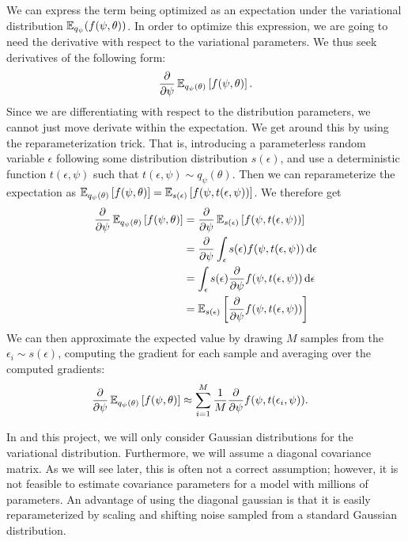 We can express the term being optimized as an expectation under the variational distribution $\operatorname{\mathbb{E}}_{q_{\psi}}(f(\psi, \theta))$.
In order to optimize this expression, we are going to need the derivative with respect to the variational parameters.
We thus seek derivatives of the following form:
\begin{align}
    \pdv{\psi} \operatorname{\mathbb{E}}_{q_\psi(\theta)}\left[ f(\psi, \theta) \right].
\end{align}
Since we are differentiating with respect to the distribution parameters, we cannot just move derivate within the expectation.
We get around this by using the reparameterization trick.
That is, introducing a parameterless random variable $\epsilon$ following some distribution distribution $s(\epsilon)$, and use a deterministic function $t(\epsilon, \psi)$ such that $t(\epsilon, \psi) \sim q_\psi(\theta)$.
Then we can reparameterize the expectation as
$ \operatorname{\mathbb{E}}_{q_\psi(\theta)}\left[ f(\psi, \theta) \right] = \operatorname{\mathbb{E}}_{s(\epsilon)}\left[ f(\psi, t(\epsilon, \psi)) \right]$.
We therefore get
\begin{equation}
    \begin{aligned}
        \pdv{\psi} \operatorname{\mathbb{E}}_{q_\psi(\theta)}\left[ f(\psi, \theta) \right] &= \pdv{\psi}\operatorname{\mathbb{E}}_{s(\epsilon)}\left[ f(\psi, t(\epsilon, \psi)) \right] \\
        &= \pdv{\psi} \int_\epsilon s(\epsilon) f(\psi, t(\epsilon, \psi))\dd{\epsilon}\\
        &= \int_\epsilon s(\epsilon) \pdv{\psi} f(\psi, t(\epsilon, \psi)) \dd{\epsilon}\\
        &= \operatorname{\mathbb{E}}_{s(\epsilon)} \left[ \pdv{\psi} f(\psi, t(\epsilon, \psi)) \right]
    \end{aligned}
\end{equation}
We can then approximate the expected value by drawing $M$ samples from the $\epsilon_i\sim s(\epsilon)$, computing the gradient for each sample and averaging over the computed gradients:
\begin{equation} 
    \begin{aligned}
        \pdv{\psi} \operatorname{\mathbb{E}}_{q_\psi(\theta)}\left[ f(\psi, \theta) \right] &\approx \sum_{i=1}^{M} \frac{1}{M} \pdv{\psi} f(\psi, t(\epsilon_i, \psi)).  
    \end{aligned}
\end{equation}

In \cite{blundell_weight_2015} and this project, we will only consider Gaussian distributions for the variational distribution.
Furthermore, we will assume a diagonal covariance matrix. 
As we will see later, this is often not a correct assumption; however, it is not feasible to estimate covariance parameters for a model with millions of parameters. 
An advantage of using the diagonal gaussian is that it is easily reparameterized by scaling and shifting noise sampled from a standard Gaussian distribution.

